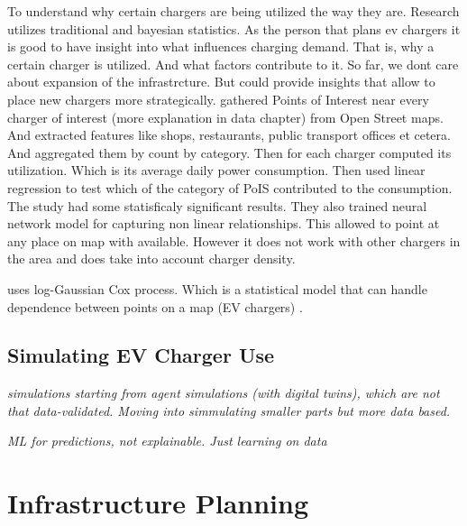
To understand why certain chargers are being utilized the way they are. Research utilizes traditional and bayesian statistics. As the person that plans ev chargers it is good to have insight into what influences charging demand. That is, why a certain charger is utilized. And what factors contribute to it. So far, we dont care about expansion of the infrastrcture. But could provide insights that allow to place new chargers more strategically.  gathered Points of Interest near every charger of interest (more explanation in data chapter) from Open Street maps. And extracted features like shops, restaurants, public transport offices et cetera. And aggregated them by count by category. Then for each charger computed its utilization. Which is its average daily power consumption. Then used linear regression to test which of the category of PoIS contributed to the consumption. The study had some statisficaly significant results. They also trained neural network model for capturing non linear relationships. This allowed to point at any place on map with available. However it does not work with other chargers in the area and does take into account charger density.

 uses log-Gaussian Cox process. Which is a statistical model that can handle dependence between points on a map (EV chargers)
.

\subsection{Simulating EV Charger Use}

\textit{simulations
    starting from agent simulations (with digital twins), which are not that data-validated. Moving into simmulating smaller parts but more data based.
}



\textit{ML for predictions, not explainable. Just learning on data}

\section{Infrastructure Planning}

